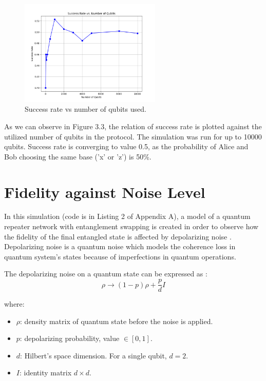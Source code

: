 \documentclass[12pt,a4paper] {report}
\begin{document}
		\begin{figure}[h!]
			\centering
			\includegraphics[width=0.6\textwidth]{bb84/success_rate_vs_num_qubits.png}
			\caption{Success rate vs number of qubits used.}
			\label{fig:}
		\end{figure}		

		As we can observe in Figure 3.3, the relation of success rate is plotted against the utilized 
		number of qubits in the protocol. The simulation was run for up to 10000 qubits. 
		Success rate is converging to value 0.5, as the probability 
		of Alice and Bob choosing the same base ('x' or 'z') is 50\%.

		\section{Fidelity against Noise Level}	
		
		In this simulation (code is in Listing 2 of Appendix A), a model of a quantum repeater network with
		entanglement swapping is created in order to observe how the fidelity of the final entangled state is
		affected by depolarizing noise \cite{depolarization}. Depolarizing noise is a quantum noise which models the
		coherence loss in quantum system's states because of imperfections in quantum operations.
		
		The depolarizing noise on a quantum state can be expressed as \cite{depolar2}:
			\[
			\rho \to (1-p)\rho + \frac{p}{d}I
			\]

		where:

		\begin{itemize}
			    \item \( \rho \): density matrix of quantum state before the noise is applied.
			    \item \( p \): depolarizing probability,  value \(\in [0, 1]\).
			    \item \( d \): Hilbert's space dimension. For a single qubit, \( d = 2 \).
			    \item \( I \): identity matrix \( d \times d \).
		\end{itemize}
\end{document}
